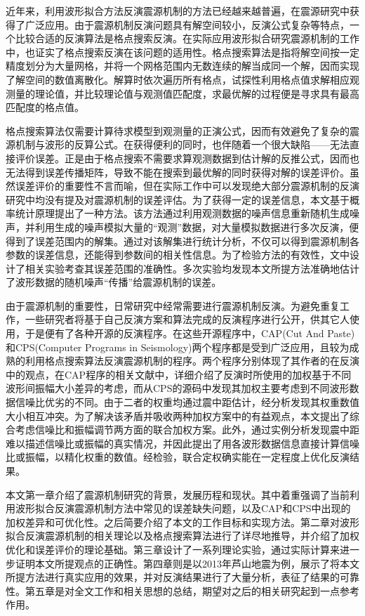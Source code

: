 

\begin{cnabstract}
近年来，利用波形拟合方法反演震源机制的方法已经越来越普遍，在震源研究中获得了广泛应用。由于震源机制反演问题具有解空间较小，反演公式复杂等特点，一个比较合适的反演算法是格点搜索反演。在实际应用波形拟合研究震源机制的工作中，也证实了格点搜索反演在该问题的适用性。格点搜索算法是指将解空间按一定精度划分为大量网格，并将一个网格范围内无数连续的解当成同一个解，因而实现了解空间的数值离散化。解算时依次遍历所有格点，试探性利用格点值求解相应观测量的理论值，并比较理论值与观测值匹配度，求最优解的过程便是寻求具有最高匹配度的格点值。

格点搜索算法仅需要计算待求模型到观测量的正演公式，因而有效避免了复杂的震源机制与波形的反算公式。在获得便利的同时，也伴随着一个很大缺陷——无法直接评价误差。正是由于格点搜索不需要求算观测数据到估计解的反推公式，因而也无法得到误差传播矩阵，导致不能在搜索到最优解的同时获得对解的误差评价。虽然误差评价的重要性不言而喻，但在实际工作中可以发现绝大部分震源机制的反演研究中均没有提及对震源机制的误差评估。为了获得一定的误差信息，本文基于概率统计原理提出了一种方法。该方法通过利用观测数据的噪声信息重新随机生成噪声，并利用生成的噪声模拟大量的“观测”数据，对大量模拟数据进行多次反演，便得到了误差范围内的解集。通过对该解集进行统计分析，不仅可以得到震源机制各参数的误差信息，还能得到参数间的相关性信息。为了检验方法的有效性，文中设计了相关实验考查其误差范围的准确性。多次实验均发现本文所提方法准确地估计了波形数据的随机噪声“传播”给震源机制的误差。

由于震源机制的重要性，日常研究中经常需要进行震源机制反演。为避免重复工作，一些研究者将基于自己反演方案和算法完成的反演程序进行公开，供其它人使用，于是便有了各种开源的反演程序。在这些开源程序中，CAP(Cut And Paste)和CPS(Computer Programs in Seismology)两个程序都是受到广泛应用，且较为成熟的利用格点搜索算法反演震源机制的程序。两个程序分别体现了其作者的在反演中的观点，在CAP程序的相关文献中，详细介绍了反演时所使用的加权基于不同波形间振幅大小差异的考虑，而从CPS的源码中发现其加权主要考虑到不同波形数据信噪比优劣的不同。由于二者的权重均通过震中距估计，经分析发现其权重数值大小相互冲突。为了解决该矛盾并吸收两种加权方案中的有益观点，本文提出了综合考虑信噪比和振幅调节两方面的联合加权方案。此外，通过实例分析发现震中距难以描述信噪比或振幅的真实情况，并因此提出了用各波形数据信息直接计算信噪比或振幅，以精化权重的数值。经检验，联合定权确实能在一定程度上优化反演结果。

本文第一章介绍了震源机制研究的背景，发展历程和现状。其中着重强调了当前利用波形拟合反演震源机制方法中常见的误差缺失问题，以及CAP和CPS中出现的加权差异和可优化性。之后简要介绍了本文的工作目标和实现方法。第二章对波形拟合反演震源机制的相关理论以及格点搜索算法进行了详尽地推导，并介绍了加权优化和误差评价的理论基础。第三章设计了一系列理论实验，通过实际计算来进一步证明本文所提观点的正确性。第四章则是以2013年芦山地震为例，展示了将本文所提方法进行真实应用的效果，并对反演结果进行了大量分析，表征了结果的可靠性。第五章是对全文工作和相关思想的总结，期望对之后的相关研究起到一点参考作用。

\end{cnabstract}

